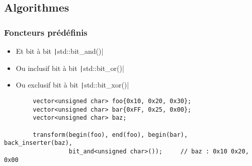 \documentclass[C++.tex]{subfiles}
\begin{document}
\subsection*{Algorithmes}
\begin{frame}[fragile]
	\frametitle{Foncteurs prédéfinis}
	\begin{itemize}
		\item Et bit à bit \texttt|std::bit_and()|
		\item Ou inclusif bit à bit \texttt|std::bit_or()|
		\item Ou exclusif bit à bit \texttt|std::bit_xor()|
	\end{itemize}

	\begin{verbatim}
		vector<unsigned char> foo{0x10, 0x20, 0x30};
		vector<unsigned char> bar{0xFF, 0x25, 0x00};
		vector<unsigned char> baz;

		transform(begin(foo), end(foo), begin(bar), back_inserter(baz), 
		          bit_and<unsigned char>());     // baz : 0x10 0x20, 0x00
	\end{verbatim}


\end{frame}
\end{document}
